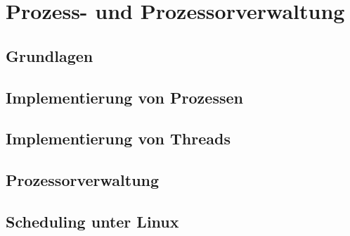 \chapter{Prozess- und Prozessorverwaltung}

\section{Grundlagen}

\section{Implementierung von Prozessen}

\section{Implementierung von Threads}

\section{Prozessorverwaltung}

\section{Scheduling unter Linux}

